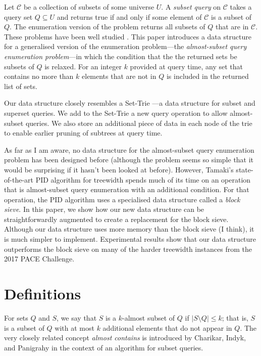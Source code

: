 Let $\mathcal{C}$ be a collection of subsets of some universe $U$.
A \emph{subset query} on $\mathcal{C}$ takes a query set $Q \subseteq U$ and
returns true if and only if some element of $\mathcal{C}$ is a subset of $Q$.
The enumeration version of the problem returns all subsets of $Q$ that
are in $\mathcal{C}$.  These problems have been well studied
\cite{DBLP:journals/siamcomp/Rivest76,DBLP:conf/ijcai/HoffmannK99,DBLP:conf/icalp/CharikarIP02,DBLP:conf/IEEEares/Savnik13}.
This paper introduces a data structure for a generalised version of the
enumeration problem---the \emph{almost-subset query enumeration problem}---in
which the condition that the the returned sets be subsets of $Q$ is relaxed.
For an integer $k$ provided at query time, any set that
contains no more than $k$ elements that are not in $Q$ is included in the
returned list of sets.

Our data structure closely resembles a Set-Trie
\cite{DBLP:conf/IEEEares/Savnik13}---a data structure for subset and superset
queries.  We add to the Set-Trie a new query operation to allow almost-subset
queries. We also store an additional piece of data in each node of the trie to
enable earlier pruning of subtrees at query time.

As far as I am aware, no data structure for the almost-subset query enumeration
problem has been designed before (although the problem seems so simple that it
would be surprising if it hasn't been looked at before).  However, Tamaki's
state-of-the-art PID algorithm for treewidth \cite{DBLP:journals/jco/Tamaki19}
spends much of its time on an operation that is almost-subset query enumeration
with an additional condition.  For that operation, the PID algorithm uses
a specialised data structure called a \emph{block sieve}.  In this paper, we
show how our new data structure can be straightforwardly augmented to create
a replacement for the block sieve.
Although our data structure uses more memory than the block sieve (I think),
it is much simpler to implement.
Experimental results show that our data structure
outperforms the block sieve on many of the harder treewidth instances from the
2017 PACE Challenge.

\section{Definitions}

For sets $Q$ and $S$, we say that $S$ is a $k$-almost subset of $Q$ if $|S \setminus Q| \leq k$;
that is, $S$ is a subset of $Q$ with at most $k$ additional elements that do not appear in $Q$.
The very closely related concept \emph{almost contains} is introduced by Charikar, Indyk, and Panigrahy
\cite{DBLP:conf/icalp/CharikarIP02} in the context of an algorithm for subset queries.

